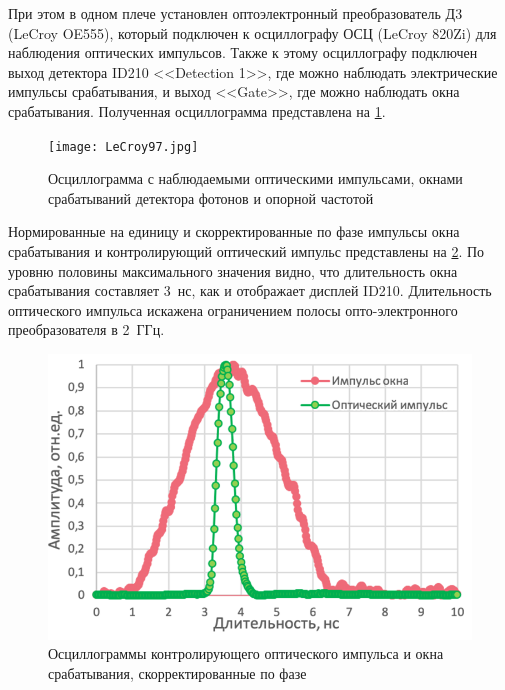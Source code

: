 При этом в одном плече установлен оптоэлектронный преобразователь Д3 (LeCroy OE555), который подключен к осциллографу ОСЦ (LeCroy 820Zi) для наблюдения оптических импульсов. Также к этому осциллографу подключен выход детектора ID210 <<Detection 1>>, где можно наблюдать электрические импульсы срабатывания, и выход <<Gate>>, где можно наблюдать окна срабатывания. Полученная осциллограмма представлена на \ref{fig:LeCroy}. 

 \begin{figure}[ht]
  \centering
  \texttt{[image: LeCroy97.jpg]}
  \caption{Осциллограмма с наблюдаемыми оптическими импульсами, окнами срабатываний детектора фотонов и опорной частотой}
  \label{fig:LeCroy}
\end{figure}

Нормированные на единицу и скорректированные по фазе импульсы окна срабатывания и контролирующий оптический импульс представлены на \ref{fig:optical_pulse_and_gate}. По уровню половины максимального значения видно, что длительность окна срабатывания составляет 3~нс, как и отображает дисплей ID210. Длительность оптического импульса искажена ограничением полосы опто-электронного преобразователя в 2~ГГц. 

 \begin{figure}[ht]
  \centering
  \includegraphics{images/optical pulse and gate.png}
  \caption{Осциллограммы контролирующего оптического импульса и окна срабатывания, скорректированные по фазе}
  \label{fig:optical_pulse_and_gate}
\end{figure}


\pagebreak


